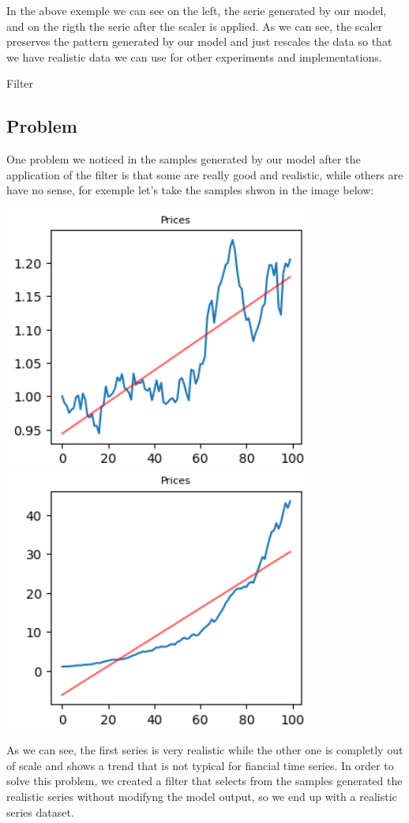 \documentclass{article}
\begin{document}
    In the above exemple we can see on the left, the serie generated by our model, and on the rigth the serie after the scaler is applied. As we can see,  
    the scaler preserves the pattern generated by our model and just rescales the data so that we have realistic data we can use for other experiments and implementations.



\begin{center}
    {\huge{Filter}}
\end{center}    
    \begin{multicols}{2}
    \section*{Problem}
    One problem we noticed in the samples generated by our model after the application of the filter is that some are really good and realistic, while others are 
    have no sense, for exemple let's take the samples shwon in the image below:
    \begin{center}
        \includegraphics[scale=0.49]{imgs/serie_comp_1.png}
        \includegraphics[scale=0.49]{imgs/serie_comp_2.png}
    \end{center}
    As we can see, the first series is very realistic while the other one is completly out of scale and shows a trend that is not 
    typical for fiancial time series. In order to solve this problem, we created a filter that selects from the samples generated the realistic series without modifyng the model output, so we end up with a realistic series dataset.

\end{multicols}
\end{document}
